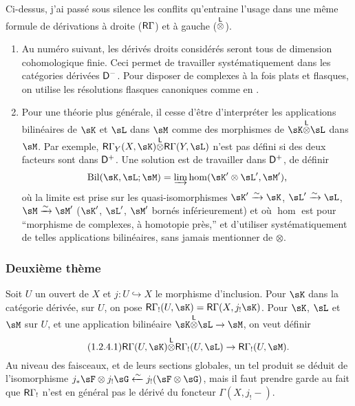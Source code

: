 Ci-dessus, j'ai passé sous silence les conflits qu'entraine l'usage dans une 
même formule de dérivations à droite ($\mathsf{R}\Gamma$) et à gauche 
(${\overset{\mathsf{L}}{\otimes}}$). 
\begin{enumerate}[\indent a)]
  \item Au numéro suivant, les dérivés droits considérés seront tous 
    de dimension cohomologique finie. Ceci permet de travailler 
    systématiquement dans les catégories dérivées $\mathsf{D}^-$. Pour disposer 
    de complexes à la fois plats et flasques, on utilise les résolutions 
    flasques canoniques comme en \cite[XVII]{sga4}. 
  \item Pour une théorie plus générale, il cesse d'être d'interpréter 
    les applications bilinéaires de $\sK$ et $\sL$ dans $\sM$ comme des 
    morphismes de $\sK\lotimes\sL$ dans $\sM$. Par exemple, 
    $\R\Gamma_Y(X,\sK)\lotimes\R\Gamma(Y,\sL)$ n'est pas défini si des deux 
    facteurs sont dans $\mathsf{D}^+$. Une solution est de travailler dans $\mathsf{D}^+$, de 
    définir 
    \[
      \operatorname{Bil}(\sK,\sL;\sM) = \varinjlim \hom(\sK'\otimes\sL',\sM') \text{,}
    \]
    où la limite est prise sur les quasi-isomorphismes $\sK'\iso \sK$, 
    $\sL'\iso \sL$, $\sM\iso \sM'$ ($\sK'$, $\sL'$, $\sM'$ bornés 
    inférieurement) et où $\hom$ est pour ``morphisme de complexes, à 
    homotopie près,'' et d'utiliser systématiquement de telles applications 
    bilinéaires, sans jamais mentionner de $\otimes$.  
\end{enumerate}




\subsubsection{Deuxième thème}\label{IV:1-2-4}

Soit $U$ un ouvert de $X$ et $j:U\hookrightarrow X$ le morphisme d'inclusion. 
Pour $\sK$ dans la catégorie dérivée, sur $U$, on pose 
$\R\Gamma_!(U,\sK)=\R\Gamma(X,j_!\sK)$. Pour $\sK$, $\sL$ et $\sM$ sur $U$, et 
une application bilinéaire $\sK\lotimes\sL\to\sM$, on veut définir 
\begin{equation*}\tag{1.2.4.1}\label{IV:eq:1-2-4-1}
  \R\Gamma(U,\sK)\lotimes\R\Gamma_!(U,\sL)\to\R\Gamma_!(U,\sM) \text{.}
\end{equation*}
Au niveau des faisceaux, et de leurs sections globales, un tel produit se 
déduit de l'isomorphisme 
$j_*\sF\otimes j_!\sG\xleftarrow\sim j_!(\sF\otimes \sG)$, mais il faut prendre 
garde au fait que $\mathsf{R}\Gamma_!$ n'est en général pas le dérivé du 
foncteur $\Gamma(X,j_!-)$. 

